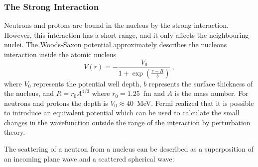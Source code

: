 
\subsubsection{The Strong Interaction}
Neutrons and protons are bound in the nucleus by the strong
interaction. However, this interaction has a short range, and it only
affects the neighbouring nuclei. The Woods-Saxon potential
approximately describes the nucleons interaction inside the atomic
nucleus
\begin{equation}
  \label{eqn:woodsax}
  V(r) = - \frac{V_0}{1+\exp(\frac{r-R}{b})}~,
\end{equation}
where $V_0$ represents the potential well depth, $b$ represents the
surface thickness of the nucleus, and $R = r_0 A^{1/3}$ where
$r_0 = 1.25$~fm and $A$ is the mass number. For neutrons and protons
the depth is $V_0 \approx 40$~MeV.
Fermi realized that it is possible to introduce an equivalent
potential which can be used to calculate the small changes in the
wavefunction outside the range of the interaction by perturbation
theory.


The scattering of a neutron from a nucleus can be described as a
superposition of an incoming plane wave and a scattered spherical
wave:

